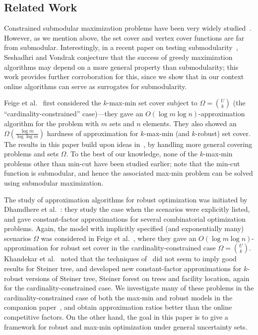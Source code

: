 \documentclass[11pt,letterpaper]{article}
\newcommand{\I}{{\Omega}}
\newcounter{note}[section]
\begin{document}
\subsection{Related Work}
\label{sec:related-work}

Constrained submodular maximization problems have been very widely studied~\cite{NWF78I,NWF78II,S04,CCPV07,V08,KST09}.
However, as we mention above, the set cover and vertex cover functions are far from submodular. Interestingly, in a
recent paper on testing submodularity~\cite{SV10}, Seshadhri and Vondrak conjecture that the success of greedy
maximization algorithms may depend on a more general property than submodularity; this work provides further
corroboration for this, since we show that in our context online algorithms can serve as surrogates for submodularity.

Feige et al.~\cite{FJMM07} first considered the $k$-max-min set cover subject to $\I = \binom{U}{k}$ (the
``cardinality-constrained'' case)---they gave an $O(\log m \log n)$-approximation algorithm for the problem with $m$ sets and $n$ elements. They also
showed an $\Omega(\frac{\log m}{\log\log m})$ hardness of approximation for $k$-max-min (and $k$-robust) set cover. The
results in this paper build upon ideas in~\cite{FJMM07}, by handling more general covering problems and sets $\I$. To
the best of our knowledge, none of the $k$-max-min problems other than min-cut have been studied earlier; note that the
min-cut function is submodular, and hence the associated max-min problem
can be solved using submodular maximization.

The study of approximation algorithms for robust optimization was initiated by Dhamdhere et al.~\cite{DGRS05,GGR06}:
they study the case when the scenarios were explicitly listed, and gave constant-factor approximations for several
combinatorial optimization problems. Again, the model with implicitly specified (and exponentially many) scenarios $\I$
was considered in Feige et al.~\cite{FJMM07}, where they gave an $O(\log m \log n)$-approximation for robust set cover
in the cardinality-constrained case $\I = \binom{U}{k}$. Khandekar et al.~\cite{KKMS08} noted that the techniques
of~\cite{FJMM07} did not seem to imply good results for Steiner tree, and developed new constant-factor approximations
for $k$-robust versions of Steiner tree, Steiner forest on trees and facility location, again for the
cardinality-constrained case. We investigate many of these problems in the cardinality-constrained case of both the
max-min and robust models in the companion paper~\cite{GNR-k-rob}, and obtain approximation ratios better than the
online competitive factors. On the other hand, the goal in this paper is to give a framework for robust and max-min
optimization under general uncertainty sets.
\end{document}
